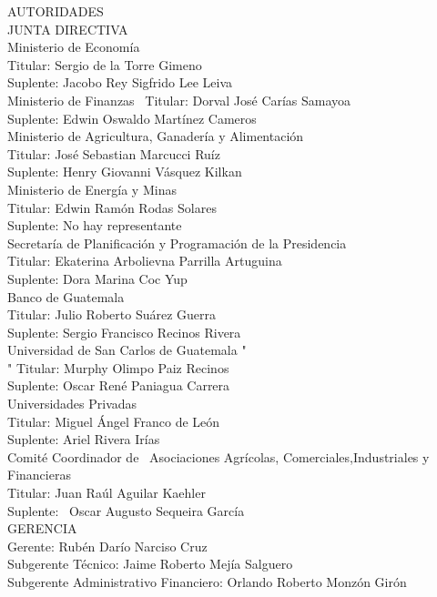	\begin{center}
		{\Bold \LARGE AUTORIDADES}\\[1cm]
		
		
		{\Bold \large \color{color1!89!black} JUNTA  DIRECTIVA} \\[0.4cm]
		
	 	 	 { \Bold Ministerio de Economía}  		\\ 
	 	 	 Titular: Sergio de la Torre Gimeno   \\ 
	 	 	 Suplente: Jacobo Rey Sigfrido Lee Leiva  \\ [0.4cm] 

	 	 	 {\Bold Ministerio de Finanzas} \ 
	 	 	 Titular: Dorval José Carías Samayoa \\ 
	 	 	Suplente: Edwin Oswaldo Martínez Cameros\\[0.4cm] 

 	 	 	 				{\Bold Ministerio de Agricultura, Ganadería y Alimentación} \\ 
 	 	 	 Titular: José Sebastian Marcucci Ruíz   \\ 
	 	 	 Suplente: Henry Giovanni Vásquez Kilkan \\ [0.4cm] 

	 	 	 {\Bold Ministerio de Energía y Minas}\\ 
			Titular: Edwin Ramón Rodas Solares \\ 
			Suplente: No hay representante\\ [0.4cm]
	 	 	 {\Bold Secretaría de Planificación y Programación de la Presidencia}   \\
 	 	 	 			 Titular: Ekaterina Arbolievna Parrilla Artuguina   \\ 
	 	 	 Suplente: Dora Marina Coc Yup\\ [0.4cm] 
	 	 	  {\Bold Banco de Guatemala} \\ 
			 Titular: Julio Roberto Suárez Guerra \\ 
			 Suplente: Sergio Francisco Recinos Rivera\\ [0.4cm] 
			 {\Bold Universidad de San Carlos de Guatemala} " \\ 
"			Titular: Murphy Olimpo Paiz Recinos   \\
			Suplente: Oscar René Paniagua Carrera  \\ [0.4cm]
{\Bold Universidades Privadas} \\
			 Titular: Miguel Ángel Franco de León \\			 Suplente: Ariel Rivera Irías\\ [0.4cm] 
			 {\Bold Comité Coordinador de \ Asociaciones  Agrícolas, Comerciales,Industriales y Financieras} \\ 
			Titular: Juan Raúl Aguilar Kaehler \\
			 Suplente:  Oscar Augusto Sequeira García  \\ [0.4cm]
	
		{\Bold \large \color{color1!89!black} GERENCIA}\\[0.2cm]
Gerente:  Rubén Darío Narciso Cruz		\\
Subgerente Técnico:  Jaime Roberto Mejía Salguero\\
Subgerente Administrativo Financiero:  Orlando Roberto Monzón Girón\\ 
	 	 	 \end{center}
